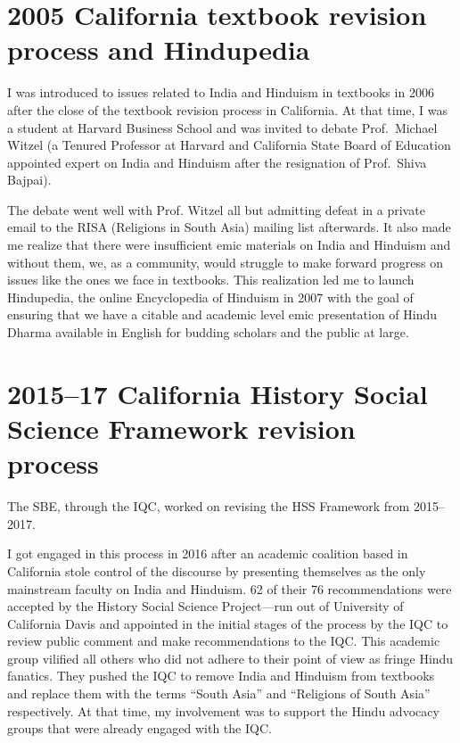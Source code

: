 \section*{2005 California textbook revision process and Hindupedia}

I was introduced to issues related to India and Hinduism in textbooks in 2006 after the close of the textbook revision process in California. At that time, I was a student at Harvard Business School and was invited to debate Prof.\ Michael Witzel (a Tenured Professor at Harvard and California State Board of Education appointed expert on India and Hinduism after the resignation of Prof.\ Shiva Bajpai).

The debate went well with Prof. Witzel all but admitting defeat in a private email to the RISA (Religions in South Asia) mailing list afterwards. It also made me realize that there were insufficient emic materials on India and Hinduism and without them, we, as a community, would struggle to make forward progress on issues like the ones we face in textbooks. This realization led me to launch Hindupedia, the online Encyclopedia of Hinduism in 2007 with the goal of ensuring that we have a citable and academic level emic presentation of Hindu Dharma available in English for budding scholars and the public at large. 

\section*{2015--17 California History Social Science Framework revision process}

The SBE, through the IQC, worked on revising the HSS Framework from 2015--2017.

I got engaged in this process in 2016 after an academic coalition based in California stole control of the discourse by presenting themselves as the only mainstream faculty on India and Hinduism. 62 of their 76 recommendations were accepted by the History Social Science Project—run out of University of California Davis and appointed in the initial stages of the process by the IQC to review public comment and make recommendations to the IQC. This academic group vilified all others who did not adhere to their point of view as fringe Hindu fanatics. They pushed the IQC to remove India and Hinduism from textbooks and replace them with the terms “South Asia” and “Religions of South Asia” respectively. At that time, my involvement was to support the Hindu advocacy groups that were already engaged with the IQC. 

